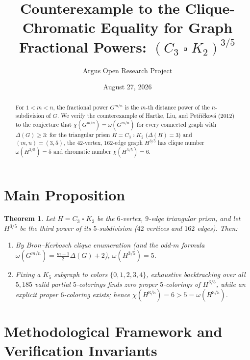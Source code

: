 \documentclass[10pt,reqno]{amsart}
\title[The Fractional Power $(C_3\mathbin{\square} K_2)^{3/5}$ Has $\chi=6 > 5=\omega$]
{Counterexample to the Clique-Chromatic Equality for Graph Fractional Powers: $(C_3\mathbin{\square} K_2)^{3/5}$}
\author{Argus Open Research Project}
\date{August 27, 2026}
\newtheorem{theorem}{Theorem}[section]
\theoremstyle{definition}
\begin{document}
\begin{abstract}
For $1<m<n$, the fractional power $G^{m/n}$ is the $m$-th distance power of the $n$-subdivision of $G$. We verify the counterexample of Hartke, Liu, and Pet\v{r}\'i\v{c}kov\'a (2012) to the conjecture that $\chi(G^{m/n})=\omega(G^{m/n})$ for every connected graph with $\Delta(G)\ge 3$: for the triangular prism $H=C_3\mathbin{\square} K_2$ ($\Delta(H)=3$) and $(m,n)=(3,5)$, the $42$-vertex, $162$-edge graph $H^{3/5}$ has clique number $\omega(H^{3/5})=5$ and chromatic number $\chi(H^{3/5})=6$.
\end{abstract}
\maketitle
\section{Main Proposition}
\begin{theorem}
Let $H=C_3\mathbin{\square} K_2$ be the $6$-vertex, $9$-edge triangular prism, and let $H^{3/5}$ be the third power of its $5$-subdivision ($42$ vertices and $162$ edges). Then:
\begin{enumerate}[label=\textup{(\arabic*)}]
  \item By Bron--Kerbosch clique enumeration (and the odd-$m$ formula $\omega(G^{m/n})=\frac{m-1}{2}\Delta(G)+2$), $\omega(H^{3/5}) = 5$.
  \item Fixing a $K_5$ subgraph to colors $\{0,1,2,3,4\}$, exhaustive backtracking over all $5{,}185$ valid partial $5$-colorings finds zero proper $5$-colorings of $H^{3/5}$, while an explicit proper $6$-coloring exists; hence $\chi(H^{3/5})=6 > 5=\omega(H^{3/5})$.
\end{enumerate}
\end{theorem}

\section{Methodological Framework and Verification Invariants}
\end{document}
